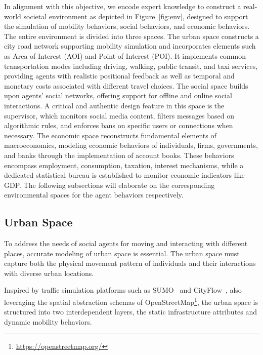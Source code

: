 In alignment with this objective, we encode expert knowledge to construct a real-world societal environment as depicted in Figure~\ref{fig:env}, designed to support the simulation of mobility behaviors, social behaviors, and economic behaviors.
The entire environment is divided into three spaces.
The urban space constructs a city road network supporting mobility simulation and incorporates elements such as Area of Interest (AOI) and Point of Interest (POI).
It implements common transportation modes including driving, walking, public transit, and taxi services, providing agents with realistic positional feedback as well as temporal and monetary costs associated with different travel choices.
The social space builds upon agents' social networks, offering support for offline and online social interactions.
A critical and authentic design feature in this space is the supervisor, which monitors social media content, filters messages based on algorithmic rules, and enforces bans on specific users or connections when necessary.
The economic space reconstructs fundamental elements of macroeconomics, modeling economic behaviors of individuals, firms, governments, and banks through the implementation of account books.
These behaviors encompass employment, consumption, taxation, interest mechanisms, while a dedicated statistical bureau is established to monitor economic indicators like GDP.
The following subsections will elaborate on the corresponding environmental spaces for the agent behaviors respectively.


\subsection{Urban Space}

To address the needs of social agents for moving and interacting with different places, accurate modeling of urban space is essential. 
The urban space must capture both the physical movement pattern of individuals and their interactions with diverse urban locations. 

Inspired by traffic simulation platforms such as SUMO~\cite{behrisch2011sumo} and CityFlow~\cite{zhang2019cityflow}, also leveraging the spatial abstraction schemas of OpenStreetMap\footnote{\url{https://openstreetmap.org/}}, the urban space is structured into two interdependent layers, the static infrastructure attributes and dynamic mobility behaviors. 

